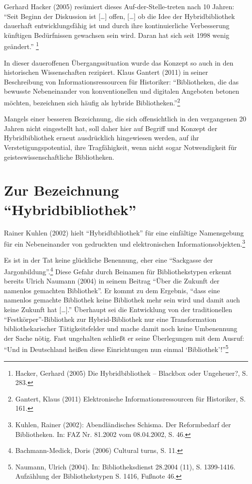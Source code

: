 \documentclass[a4paper,
fontsize=11pt,
oneside,
numbers=noperiodatend,
parskip=half-,
bibliography=totoc,
final
]{scrartcl}
\begin{document}
Gerhard Hacker (2005) resümiert dieses Auf-der-Stelle-treten nach 10
Jahren: \enquote{Seit Beginn der Diskussion ist {[}\ldots{}{]} offen,
{[}\ldots{}{]} ob die Idee der Hybridbibliothek dauerhaft
entwicklungsfähig ist und durch ihre kontinuierliche Verbesserung
künftigen Bedürfnissen gewachsen sein wird. Daran hat sich seit 1998
wenig geändert.} \footnote{Hacker, Gerhard (2005) Die Hybridbibliothek
  -- Blackbox oder Ungeheuer?, S. 283.}

In dieser daueroffenen Übergangssituation wurde das Konzept so auch in
den historischen Wissenschaften rezipiert. Klaus Gantert (2011) in
seiner Beschreibung von Informationsressourcen für Historiker:
\enquote{Bibliotheken, die das bewusste Nebeneinander von
konventionellen und digitalen Angeboten betonen möchten, bezeichnen sich
häufig als hybride Bibliotheken.}\footnote{Gantert, Klaus (2011)
  Elektronische Informationsressourcen für Historiker, S. 161.}

Mangels einer besseren Bezeichnung, die sich offensichtlich in den
vergangenen 20 Jahren nicht eingestellt hat, soll daher hier auf Begriff
und Konzept der Hybridbibliothek erneut ausdrücklich hingewiesen werden,
auf ihr Verstetigungspotential, ihre Tragfähigkeit, wenn nicht sogar
Notwendigkeit für geisteswissenschaftliche Bibliotheken.

\section*{\texorpdfstring{Zur Bezeichnung
\enquote{Hybridbibliothek}}{Zur Bezeichnung Hybridbibliothek}}\label{zur-bezeichnung-hybridbibliothek}

Rainer Kuhlen (2002) hielt \enquote{Hybridbibliothek} für eine
einfältige Namensgebung für ein Nebeneinander von gedruckten und
elektronischen Informationsobjekten.\footnote{Kuhlen, Rainer (2002):
  Abendländisches Schisma. Der Reformbedarf der Bibliotheken. In: FAZ
  Nr. 81.2002 vom 08.04.2002, S. 46.}

Es ist in der Tat keine glückliche Benennung, eher eine
\enquote{Sackgasse der Jargonbildung}.\footnote{Bachmann-Medick, Doris
  (2006) Cultural turns, S. 11.} Diese Gefahr durch Beinamen für
Bibliothekstypen erkennt bereits Ulrich Naumann (2004) in seinem Beitrag
\enquote{Über die Zukunft der namenlos gemachten Bibliothek}. Er kommt
zu dem Ergebnis, \enquote{dass eine namenlos gemachte Bibliothek keine
Bibliothek mehr sein wird und damit auch keine Zukunft hat
{[}\ldots{}{]}.} Überhaupt sei die Entwicklung von der traditionellen
\enquote{Festkörper}-Bibliothek zur Hybrid-Bibliothek nur eine
Transformation bibliothekarischer Tätigkeitsfelder und mache damit noch
keine Umbenennung der Sache nötig. Fast ungehalten schließt er seine
Überlegungen mit dem Ausruf: \enquote{Und in Deutschland heißen diese
Einrichtungen nun einmal \enquote{Bibliothek}!}\footnote{Naumann, Ulrich
  (2004). In: Bibliotheksdienst 28.2004 (11), S. 1399-1416. Aufzählung
  der Bibliothekstypen S. 1416, Fußnote 46.}
\end{document}
